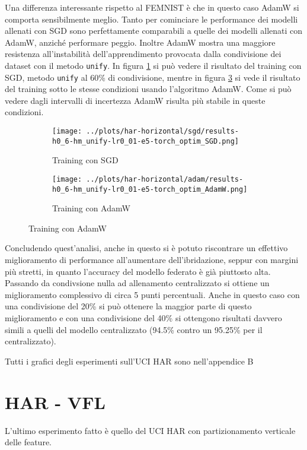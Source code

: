 Una differenza interessante rispetto al FEMNIST è che in questo 
caso AdamW si comporta sensibilmente meglio. Tanto per cominciare
le performance dei modelli allenati con SGD sono perfettamente 
comparabili a quelle dei modelli allenati con AdamW, anziché 
performare peggio. Inoltre AdamW mostra una maggiore resistenza 
all'instabilità dell'apprendimento provocata dalla condivisione 
dei dataset con il metodo \texttt{unify}. In figura 
\ref{fig:haru6sgd} si può vedere il risultato del training con SGD,
metodo \texttt{unify} al 60\% di condivisione, mentre in figura 
\ref{fig:haru6adam} si vede il risultato del training sotto le 
stesse condizioni usando l'algoritmo AdamW. Come si può vedere 
dagli intervalli di incertezza AdamW risulta più stabile in 
queste condizioni.
\begin{figure}[htp]  %
    \centering
    \begin{subfigure}[b]{0.49\textwidth}
        \centering
        \texttt{[image: ../plots/har-horizontal/sgd/results-h0\_6-hm\_unify-lr0\_01-e5-torch\_optim\_SGD.png]}
        \caption{Training con SGD}
        \label{fig:haru6sgd}
    \end{subfigure}
    \hfill
    \begin{subfigure}[b]{0.49\textwidth}
        \centering
        \texttt{[image: ../plots/har-horizontal/adam/results-h0\_6-hm\_unify-lr0\_01-e5-torch\_optim\_AdamW.png]}
        \caption{Training con AdamW}
        \label{fig:haru6adam}
    \end{subfigure}
\end{figure}

Concludendo quest'analisi, anche in questo si è potuto riscontrare
un effettivo miglioramento di performance all'aumentare dell'ibridazione,
seppur con margini più stretti, in quanto l'accuracy del modello 
federato è già piuttosto alta. Passando da condivsione nulla ad allenamento
centralizzato si ottiene un miglioramento complessivo di circa 5 punti 
percentuali. Anche in questo caso con una condivisione del 20\% si può 
ottenere la maggior parte di questo miglioramento e con una condivisione 
del 40\% si ottengono risultati davvero simili a quelli del modello 
centralizzato (94.5\% contro un 95.25\% per il centralizzato).

Tutti i grafici degli esperimenti sull'UCI HAR sono nell'appendice B

\clearpage
\section{HAR - VFL}
L'ultimo esperimento fatto è quello del UCI HAR con partizionamento 
verticale delle feature.

